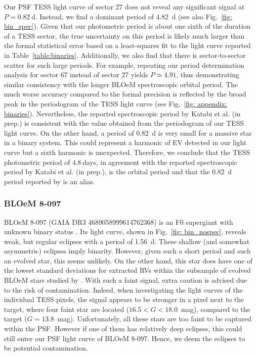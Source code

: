 \documentclass[fleqn,usenatbib]{mnras}
\begin{document}
Our PSF TESS light curve of sector 27 does not reveal any significant signal at $P=0.82~$d. Instead, we find a dominant period of 4.82~d (see also Fig.~\ref{fig: bin_spec}). Given that our photometric period is about one sixth of the duration of a TESS sector, the true uncertainty on this period is likely much larger than the formal statistical error based on a least-squares fit to the light curve reported in Table~\ref{table:binaries}. Additionally, we also find that there is sector-to-sector scatter for such large periods. For example, repeating our period determination analysis for sector 67 instead of sector 27 yields $P\simeq4.91$, thus demonstrating similar consistency with the longer BLOeM spectroscopic orbital period. The much worse accuracy compared to the formal precision is reflected by the broad peak in the periodogram of the TESS light curve (see Fig.~\ref{fig: appendix: binaries}). Nevertheless, the reported spectroscopic period by {\color{blue}Katabi et al.} (in prep.) is consistent with the value obtained from the periodogram of our TESS light curve. On the other hand, a period of 0.82~d is very small for a massive star in a binary system. This could represent a harmonic of EV detected in our light curve but a sixth harmonic is unexpected. Therefore, we conclude that the TESS photometric period of $4.8~$days, in agreement with the reported spectroscopic period by {\color{blue}Katabi et al.} (in prep.), is the orbital period and that the 0.82~d period reported by \citet{Britavskiy+2025} is an alias.

\subsubsection{BLOeM 8-097}
BLOeM 8-097 (GAIA DR3 4689058999614762368) is an F0 supergiant with unknown binary status \citep{Patrick+2025}. Its light curve, shown in Fig.~\ref{fig: bin_nospec}, reveals weak, but regular eclipses with a period of 1.56~d. These shallow (and somewhat asymmetric) eclipses imply binarity. However, given such a short period and such an evolved star, this seems unlikely. On the other hand, this star does have one of the lowest standard deviations for extracted RVs within the subsample of evolved BLOeM stars studied by \citet{Patrick+2025}. With such a faint signal, extra caution is advised due to the risk of contamination. Indeed, when investigating the light curves of the individual TESS pixels, the signal appears to be stronger in a pixel next to the target, where four faint star are located ($16.5 < G < 18.0$~mag), compared to the target ($G = 13.8$~mag). Unfortunately, all these stars are too faint to be captured within the PSF. However if one of them has relatively deep eclipses, this could still enter our PSF light curve of BLOeM 8-097. Hence, we deem the eclipses to be potential contamination.
\end{document}
